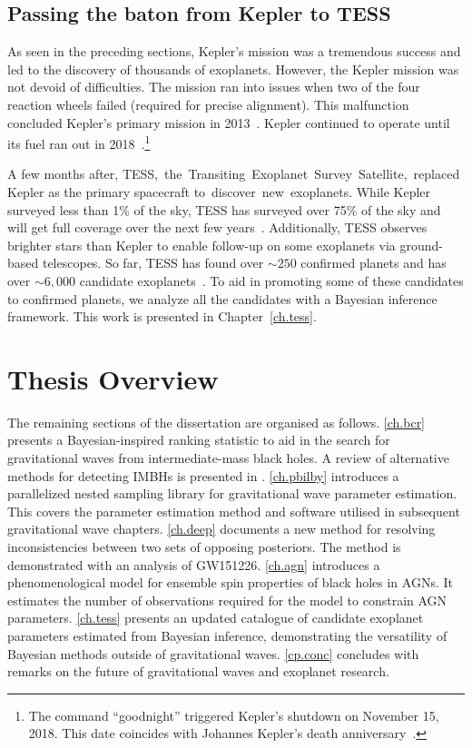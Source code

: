 \subsection{Passing the baton from Kepler to TESS }
As seen in the preceding sections, Kepler's mission was a tremendous success and led to the discovery of thousands of exoplanets.
However, the Kepler mission was not devoid of difficulties.
The mission ran into issues when two of the four reaction wheels failed (required for precise alignment). 
This malfunction concluded Kepler's primary mission in 2013~\cite{cowen2013wheels}.
Kepler continued to operate until its fuel ran out in 2018~\cite{KeplerShutdown}.\footnote{The command ``goodnight'' triggered Kepler's shutdown on November 15, 2018. This date coincides with Johannes Kepler's death anniversary~\cite{KeplerShutdown}.}

A few months after, TESS, the Transiting Exoplanet Survey Satellite, replaced Kepler as the primary spacecraft to discover new exoplanets.
While Kepler surveyed less than 1\% of the sky, TESS has surveyed over 75\% of the sky and will get full coverage over the next few years~\cite{tess}. 
Additionally, TESS observes brighter stars than Kepler to enable follow-up on some exoplanets via ground-based telescopes.  
So far, TESS has found over $\sim250$ confirmed planets and has over $\sim6,000$ candidate exoplanets~\cite{Akeson:2019:AAS,  Stassun:2019:AJ}. 
To aid in promoting some of these candidates to confirmed planets, we analyze all the candidates with a Bayesian inference framework. 
This work is presented in Chapter~\ref{ch.tess}.


\section{Thesis Overview}
The remaining sections of the dissertation are organised as follows. 
\cref{ch.bcr} presents a Bayesian-inspired ranking statistic to aid in the search for gravitational waves from intermediate-mass black holes. 
A review of alternative methods for detecting IMBHs is presented in . 
\cref{ch.pbilby} introduces a parallelized nested sampling library for gravitational wave parameter estimation. 
This covers the parameter estimation method and software utilised in subsequent gravitational wave chapters. 
\cref{ch.deep} documents a new method for resolving inconsistencies between two sets of opposing posteriors. 
The method is demonstrated with an analysis of GW151226. 
\cref{ch.agn} introduces a phenomenological model for ensemble spin properties of black holes in AGNs. It estimates the number of observations required for the model to constrain AGN parameters. 
\cref{ch.tess} presents an updated catalogue of candidate exoplanet parameters estimated from Bayesian inference, demonstrating the versatility of Bayesian methods outside of gravitational waves.
\cref{cp.conc} concludes with remarks on the future of gravitational waves and exoplanet research.
